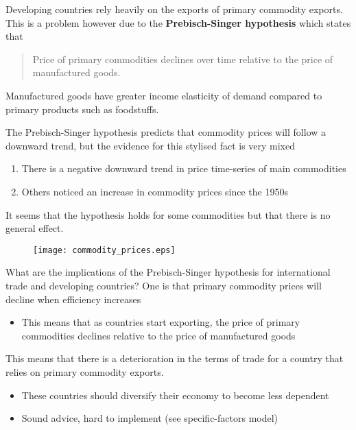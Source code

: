 \documentclass{beamer}
\begin{document}
\begin{frame}
 Developing countries rely heavily on the exports of primary commodity exports. 
 This is a problem however due to the \textbf{Prebisch-Singer hypothesis} which states that
 \medskip

 \begin{quote}
   Price of primary commodities declines over time relative to the price of manufactured goods.
 \end{quote}
 \medskip
 Manufactured goods have greater income elasticity of demand compared to primary products such as foodstuffs.
\end{frame}

\begin{frame}
  The Prebisch-Singer hypothesis predicts that commodity prices will follow a downward trend, but the evidence for this stylised fact is very mixed
  \begin{enumerate}
    \item There is a negative downward trend in price time-series of main commodities
    \item Others noticed an increase in commodity prices since the 1950s
  \end{enumerate}
  \medskip
  It seems that the hypothesis holds for some commodities but that there is no general effect.
\end{frame}

\begin{frame}
  \begin{figure}
    \texttt{[image: commodity\_prices.eps]}
  \end{figure}
\end{frame}

\begin{frame}
 What are the implications of the Prebisch-Singer hypothesis for international trade and developing countries?
 One is that primary commodity prices will decline when efficiency increases
 \begin{itemize}
   \item This means that as countries start exporting, the price of primary commodities declines relative to the price of manufactured goods
 \end{itemize}
 \medskip
 This means that there is a deterioration in the terms of trade for a country that relies on primary commodity exports.
 \begin{itemize}
   \item These countries should diversify their economy to become less dependent
   \item Sound advice, hard to implement (see specific-factors model)
 \end{itemize}
\end{frame}
\end{document}
